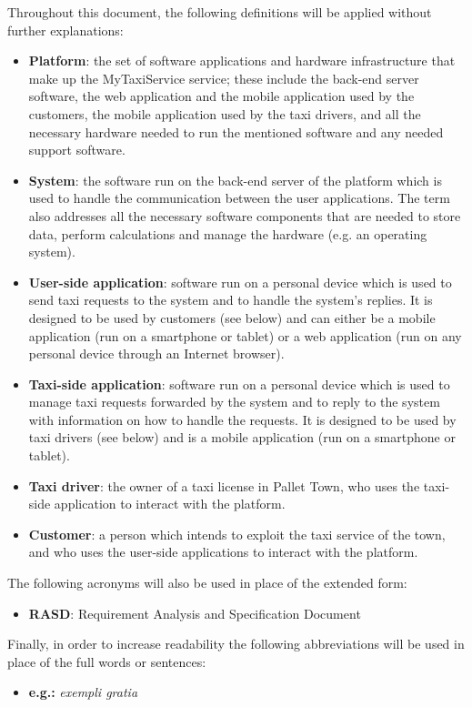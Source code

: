 \documentclass[english]{article}
\begin{document}
Throughout this document, the following definitions will be applied
without further explanations:
\begin{itemize}
\item \textbf{Platform}: the set of software applications and hardware infrastructure
that make up the MyTaxiService service; these include the back-end
server software, the web application and the mobile application used
by the customers, the mobile application used by the taxi drivers,
and all the necessary hardware needed to run the mentioned software
and any needed support software. 
\item \textbf{System}: the software run on the back-end server of the platform
which is used to handle the communication between the user applications.
The term also addresses all the necessary software components that
are needed to store data, perform calculations and manage the hardware
(e.g. an operating system).
\item \textbf{User-side application}: software run on a personal device
which is used to send taxi requests to the system and to handle the
system's replies. It is designed to be used by customers (see below)
and can either be a mobile application (run on a smartphone or tablet)
or a web application (run on any personal device through an Internet
browser). 
\item \textbf{Taxi-side application}: software run on a personal device
which is used to manage taxi requests forwarded by the system and
to reply to the system with information on how to handle the requests.
It is designed to be used by taxi drivers (see below) and is a mobile
application (run on a smartphone or tablet). 
\item \textbf{Taxi driver}: the owner of a taxi license in Pallet Town,
who uses the taxi-side application to interact with the platform.
\item \textbf{Customer}: a person which intends to exploit the taxi service
of the town, and who uses the user-side applications to interact with
the platform.
\end{itemize}
The following acronyms will also be used in place of the extended
form:
\begin{itemize}
\item \textbf{RASD}: Requirement Analysis and Specification Document
\end{itemize}
Finally, in order to increase readability the following abbreviations
will be used in place of the full words or sentences:
\begin{itemize}
\item \textbf{e.g.: }\textit{exempli gratia}
\end{itemize}
\end{document}
